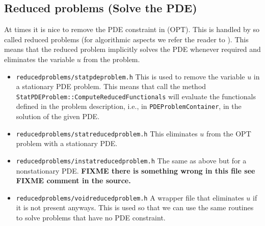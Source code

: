 \documentclass[prodmode,acmtoms]{acmsmall}
\numberwithin{equation}{section}
\begin{document}
\subsection{Reduced problems (Solve the PDE)}
At times it is nice to remove the PDE constraint in (OPT). 
This is handled by so called reduced 
problems (for algorithmic aspects we refer the reader to 
\cite{BeMeVe06}). 
This means that the reduced problem implicitly solves the PDE whenever required
and eliminates the variable $u$ from the problem.
\begin{itemize}
\item \texttt{reducedproblems/statpdeproblem.h} This is used to remove the variable $u$ in 
  a stationary PDE problem. This means that call the method \\
  \texttt{StatPDEProblem::ComputeReducedFunctionals} will evaluate the functionals 
  defined in the problem description, i.e., in \texttt{PDEProblemContainer}, in the 
  solution of the given PDE.
\item \texttt{reducedproblems/statreducedproblem.h} This eliminates $u$ from the OPT
  problem with a stationary PDE.
\item \texttt{reducedproblems/instatreducedproblem.h} The same as above but for a
  nonstationary PDE. {\bf FIXME there is something wrong in this file see FIXME 
    comment in the source.}
\item \texttt{reducedproblems/voidreducedproblem.h} A wrapper file that eliminates $u$ 
  if it is not present anyways. This is used so that we can use the same routines to 
  solve problems that have no PDE constraint.
\end{itemize}
\end{document}
